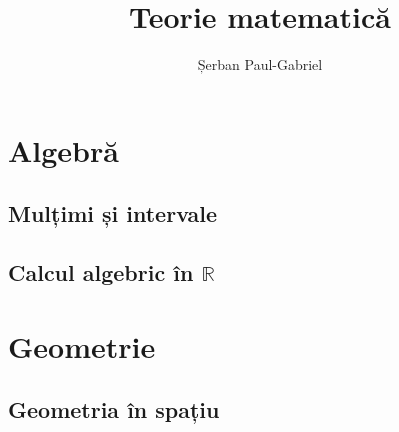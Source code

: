 \documentclass[oneside]{book}
\title{Teorie matematică}
\author{Șerban Paul-Gabriel}
\date{}
\newcommand{\bchapter}[1]{\chapter{#1} \minitoc}
\begin{document}
    \renewcommand{\contentsname}{Cuprins}
    \renewcommand{\chaptername}{Capitolul}
    \renewcommand{\partname}{Partea}
    \renewcommand{\mtctitle}{Cuprinsul capitolului}

    \dominitoc
    \setcounter{minitocdepth}{2}
    \setcounter{tocdepth}{1}
    \pagestyle{plain}

    \maketitle

    \tableofcontents

    \part{Algebră}
        \bchapter{Mulțimi și intervale}
        
        \bchapter{Calcul algebric în $\mathbb{R}$}
        

    \part{Geometrie}
        \bchapter{Geometria în spațiu}
        
\end{document}
